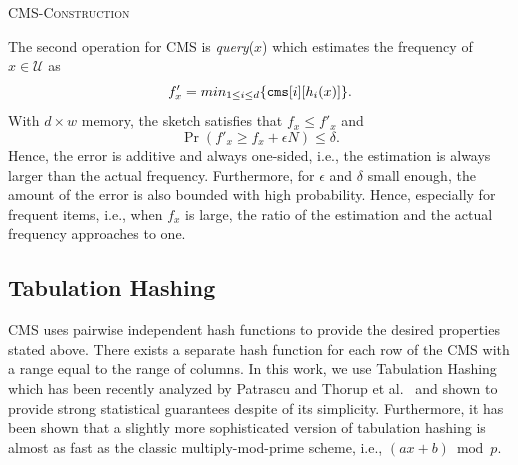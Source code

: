 \documentclass[10pt, review=true,sigconf]{acmart}
\begin{document}
 \begin{algorithm}[htbp]
  	\small
  	\caption{\textsc{CMS-Construction}} 
	\label{alg:cms_construct}
\end{algorithm} 	

 
The second operation for CMS is {\em query}($x$) which estimates the frequency of $x \in \mathcal{U}$ as $$f'_x = min_{1 \leq i \leq d}\{{\tt cms}[i][h_i(x)]\}.$$
\noindent With $d \times w$ memory, the sketch satisfies that
 $f_x \leq f'_x$ and $$\Pr\left(f'_x \geq f_x + \epsilon N\right) \leq \delta.$$ Hence, the error is additive and always one-sided, i.e., the
 estimation is always larger than the actual frequency. Furthermore, for $\epsilon$ and $\delta$ small enough, the amount of the error 
 is also bounded with high probability. Hence, especially for frequent items, i.e., when $f_x$ is large, the ratio of the estimation and the actual frequency approaches to one.  

\subsection{Tabulation Hashing}

CMS uses pairwise independent hash functions to provide the desired properties stated above. There exists a separate hash function for each row of the CMS with a range equal 
to the range of columns. In this work, we use Tabulation Hashing~\cite{zobrist1970} which has been recently analyzed by Patrascu and Thorup et al.~\cite{patrascu2012,thorup2017} and shown to provide  strong  statistical guarantees despite of its simplicity. Furthermore, it has been shown that a slightly more sophisticated version of tabulation hashing is almost as fast as the classic multiply-mod-prime scheme, i.e., $(ax + b) \bmod p$. 
\end{document}
